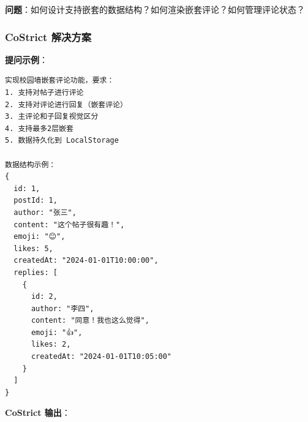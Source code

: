 \documentclass[12pt,a4paper]{article}
\begin{document}
\textbf{问题}：如何设计支持嵌套的数据结构？如何渲染嵌套评论？如何管理评论状态？

\subsubsection{CoStrict 解决方案}

\textbf{提问示例}：
\begin{verbatim}
实现校园墙嵌套评论功能，要求：
1. 支持对帖子进行评论
2. 支持对评论进行回复（嵌套评论）
3. 主评论和子回复视觉区分
4. 支持最多2层嵌套
5. 数据持久化到 LocalStorage

数据结构示例：
{
  id: 1,
  postId: 1,
  author: "张三",
  content: "这个帖子很有趣！",
  emoji: "😊",
  likes: 5,
  createdAt: "2024-01-01T10:00:00",
  replies: [
    {
      id: 2,
      author: "李四",
      content: "同意！我也这么觉得",
      emoji: "👍",
      likes: 2,
      createdAt: "2024-01-01T10:05:00"
    }
  ]
}
\end{verbatim}

\textbf{CoStrict 输出}：
\end{document}
